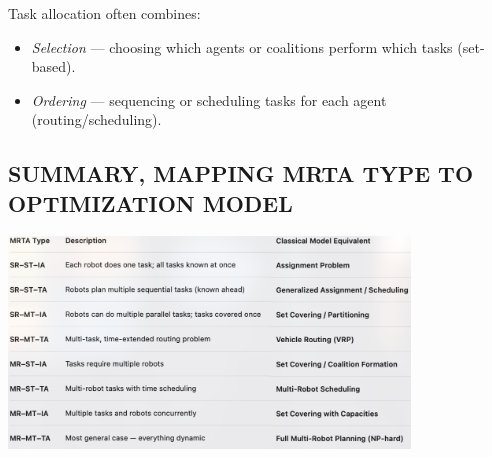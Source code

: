 Task allocation often combines:
\begin{itemize}
    \item \textit{Selection} — choosing which agents or coalitions perform which tasks (set-based).
    \item \textit{Ordering} — sequencing or scheduling tasks for each agent (routing/scheduling).
\end{itemize}


\subsection*{SUMMARY, MAPPING MRTA TYPE TO OPTIMIZATION MODEL}

\begin{center}
    \includegraphics[width=0.8\textwidth]{images/MRTA_Summary.png}
\end{center}
